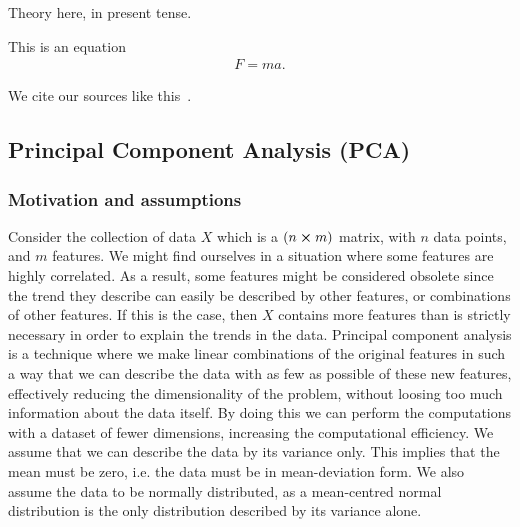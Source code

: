 Theory here, in present tense.

This is an equation
\begin{align} \label{theo:eq:newton2}
    F = ma.
\end{align}

We cite our sources like this~\citep{Project1}.

\subsection{Principal Component Analysis (PCA)}

    \subsubsection{Motivation and assumptions}
        Consider the collection of data $X$ which is a $(n\cross m)$ matrix, with $n$ data points, and $m$ features. We might find ourselves in a situation where some features are highly correlated. As a result, some features might be considered obsolete since the trend they describe can easily be described by other features, or combinations of other features. If this is the case, then $X$ contains more features than is strictly necessary in order to explain the trends in the data. Principal component analysis is a technique where we make linear combinations of the original features in such a way that we can describe the data with as few as possible of these new features, effectively reducing the dimensionality of the problem, without loosing too much information about the data itself. By doing this we can perform the computations with a dataset of fewer dimensions, increasing the computational efficiency. We assume that we can describe the data by its variance only. This implies that the mean must be zero, i.e. the data must be in mean-deviation form. We also assume the data to be normally distributed, as a mean-centred normal distribution is the only distribution described by its variance alone.
        
